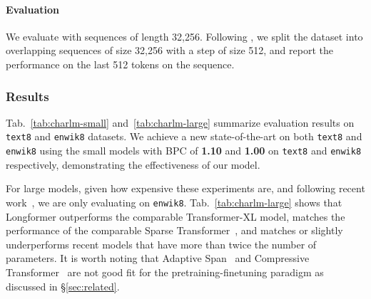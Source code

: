 \documentclass[11pt,a4paper]{article}
\newcommand{\model}{Longformer\xspace}
\begin{document}
\paragraph{Evaluation}
We evaluate with sequences of length 32,256.  Following \citet{transformerxl}, we split the dataset into overlapping sequences 
of size 32,256 with a step of size 512, and report the performance on the last 512 tokens on the sequence. 


\subsubsection{Results}
Tab.~\ref{tab:charlm-small} and~\ref{tab:charlm-large} summarize evaluation results on \texttt{text8} and \texttt{enwik8} datasets. 
We achieve a new state-of-the-art on both \texttt{text8} and \texttt{enwik8} using the small models with BPC of \textbf{1.10} and \textbf{1.00} on \texttt{text8} and \texttt{enwik8} respectively, demonstrating the effectiveness of our model.


For large models, given how expensive these experiments are, 
and following recent work~\cite{reformer,compressive}, 
we are only evaluating on \texttt{enwik8}. 
Tab.~\ref{tab:charlm-large} shows that \model
outperforms the comparable Transformer-XL model, 
matches the performance of the comparable Sparse Transformer~\cite{sparseOpenai},
and matches or slightly underperforms recent models 
that have more than twice the number of parameters.
It is worth noting that Adaptive Span~\cite{adaptivespan}
and Compressive Transformer~\cite{compressive}
are not good fit for the pretraining-finetuning paradigm as discussed in 
\S\ref{sec:related}.
\end{document}
